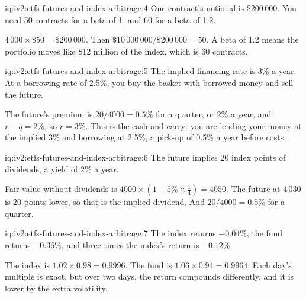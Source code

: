 \begin{solution}{iq:iv2:etfs-futures-and-index-arbitrage:4}
One contract's notional is \$200\,000. You need 50 contracts for a beta of 1, and 60 for a beta of 1.2.

$4\,000 \times \$50 = \$200\,000$. Then $\$10\,000\,000/\$200\,000 = 50$. A beta of 1.2 means the portfolio moves like \$12 million of the index, which is 60 contracts.

\end{solution}

\begin{solution}{iq:iv2:etfs-futures-and-index-arbitrage:5}
The implied financing rate is 3\% a year. At a borrowing rate of 2.5\%, you buy the basket with borrowed money and sell the future.

The future's premium is $20/4000 = 0.5\%$ for a quarter, or 2\% a year, and $r - q = 2\%$, so $r = 3\%$. This is the cash and carry: you are lending your money at the implied 3\% and borrowing at 2.5\%, a pick-up of 0.5\% a year before costs.

\end{solution}

\begin{solution}{iq:iv2:etfs-futures-and-index-arbitrage:6}
The future implies 20 index points of dividends, a yield of 2\% a year.

Fair value without dividends is $4000 \times (1 + 5\% \times \tfrac14) = 4050$. The future at 4\,030 is 20 points lower, so that is the implied dividend. And $20/4000 = 0.5\%$ for a quarter.

\end{solution}

\begin{solution}{iq:iv2:etfs-futures-and-index-arbitrage:7}
The index returns $-0.04\%$, the fund returns $-0.36\%$, and three times the index's return is $-0.12\%$.

The index is $1.02 \times 0.98 = 0.9996$. The fund is $1.06 \times 0.94 = 0.9964$. Each day's multiple is exact, but over two days, the return compounds differently, and it is lower by the extra volatility.

\end{solution}

